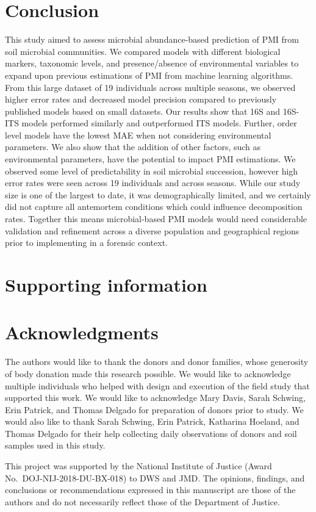 \documentclass[
  10pt,
  letterpaper,
]{article}
\begin{document}
\hypertarget{conclusion}{%
\section{Conclusion}\label{conclusion}}

This study aimed to assess microbial abundance-based prediction of PMI
from soil microbial communities. We compared models with different
biological markers, taxonomic levels, and presence/absence of
environmental variables to expand upon previous estimations of PMI from
machine learning algorithms. From this large dataset of 19 individuals
across multiple seasons, we observed higher error rates and decreased
model precision compared to previously published models based on small
datasets. Our results show that 16S and 16S-ITS models performed
similarly and outperformed ITS models. Further, order level models have
the lowest MAE when not considering environmental parameters. We also
show that the addition of other factors, such as environmental
parameters, have the potential to impact PMI estimations. We observed
some level of predictability in soil microbial succession, however high
error rates were seen across 19 individuals and across seasons. While
our study size is one of the largest to date, it was demographically
limited, and we certainly did not capture all antemortem conditions
which could influence decomposition rates. Together this means
microbial-based PMI models would need considerable validation and
refinement across a diverse population and geographical regions prior to
implementing in a forensic context.

\hypertarget{supporting-information}{%
\section{Supporting information}\label{supporting-information}}

\hypertarget{acknowledgments}{%
\section{Acknowledgments}\label{acknowledgments}}

The authors would like to thank the donors and donor families, whose
generosity of body donation made this research possible. We would like
to acknowledge multiple individuals who helped with design and execution
of the field study that supported this work. We would like to
acknowledge Mary Davis, Sarah Schwing, Erin Patrick, and Thomas Delgado
for preparation of donors prior to study. We would also like to thank
Sarah Schwing, Erin Patrick, Katharina Hoeland, and Thomas Delgado for
their help collecting daily observations of donors and soil samples used
in this study.

This project was supported by the National Institute of Justice (Award
No.~DOJ-NIJ-2018-DU-BX-018) to DWS and JMD. The opinions, findings, and
conclusions or recommendations expressed in this manuscript are those of
the authors and do not necessarily reflect those of the Department of
Justice.


\nolinenumbers
  
\end{document}
